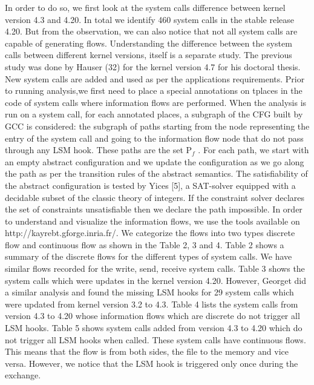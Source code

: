 In order to do so, we first look at the system calls difference between kernel version 4.3 and 4.20. In total we identify 460 system calls in the stable release 4.20. But from the observation, we can also notice that not all system calls are capable of generating flows. Understanding the difference between the system calls between different kernel versions, itself is a separate study. The previous study was done by Hauser (32) for the kernel version 4.7 for his doctoral thesis. New system calls are added and used as per the applications requirements. 
\vskip 0.2in
Prior to running analysis,we first need to place a special annotations on tplaces in the code of system calls where information flows are performed. When the analysis is run on a system call, for each
annotated places, a subgraph of the CFG built by GCC is considered:
the subgraph of paths starting from the node representing the entry
of the system call and going to the information flow node that
do not pass through any LSM hook. These paths are the set P$_f$
.
For each path, we start with an empty abstract configuration and
we update the configuration as we go along the path as per the
transition rules of the abstract semantics. The satisfiability of the
abstract configuration is tested by Yices [5], a SAT-solver equipped
with a decidable subset of the classic theory of integers. If the
constraint solver declares the set of constraints unsatisfiable then
we declare the path impossible.
\vskip 0.2in
In order to understand and visualize the information flows, we use the tools available on http://kayrebt.gforge.inria.fr/. We categorize the flows into two types discrete flow and continuous flow as shown in the Table 2, 3 and 4. Table 2 shows a summary of the discrete flows for the different types of system calls. We have similar flows recorded for the write, send, receive system calls. Table 3 shows the system calls which were updates in the kernel version 4.20. However, Georget did a similar analysis and found the missing LSM hooks for 29 system calls which were updated from kernel version 3.2 to 4.3. Table 4 lists the system calls from version 4.3 to 4.20 whose information flows which are discrete do not trigger all LSM hooks. Table 5 shows system calls added from version 4.3 to 4.20 which do not trigger all LSM hooks when called. These system calls have continuous flows. This means that the flow is from both sides, the file to the memory and vice versa. However, we notice that the LSM hook is triggered only once during the exchange.

